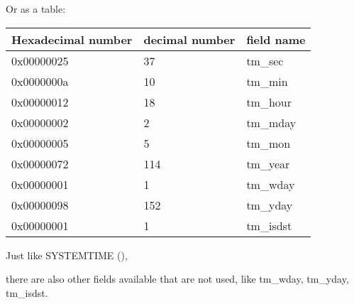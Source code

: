 Or as a table:

\begin{center}
\begin{tabular}{ | l | l | l | }
\hline
\headercolor{} Hexadecimal number & 
\headercolor{} decimal number & 
\headercolor{} field name \\
\hline
0x00000025 & 37 	& tm\_sec \\
\hline
0x0000000a & 10 	& tm\_min \\
\hline
0x00000012 & 18 	& tm\_hour \\	
\hline
0x00000002 & 2 		& tm\_mday \\	
\hline
0x00000005 & 5 		& tm\_mon \\	
\hline
0x00000072 & 114 	& tm\_year \\
\hline
0x00000001 & 1 		& tm\_wday \\	
\hline
0x00000098 & 152 	& tm\_yday \\	
\hline
0x00000001 & 1 		& tm\_isdst \\
\hline
\end{tabular}
\end{center}

Just like SYSTEMTIME (), 

there are also other fields available that are not used, like tm\_wday, tm\_yday, tm\_isdst.
